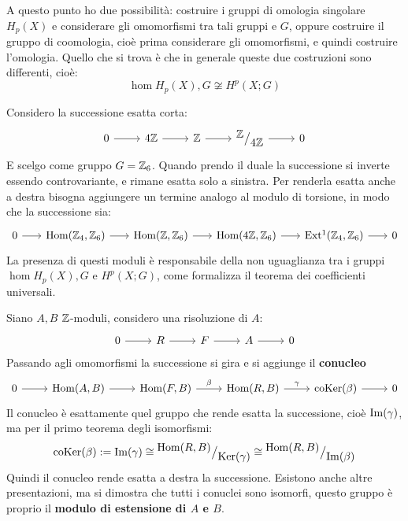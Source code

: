 A questo punto ho due possibilità: costruire i gruppi di omologia singolare
$ H_p(X) $ e considerare gli omomorfismi tra tali gruppi e $ G $, oppure
costruire il gruppo di coomologia, cioè prima considerare gli omomorfismi, e
quindi costruire l'omologia. Quello che si trova è che in generale queste
due costruzioni sono differenti, cioè:
\[
  \hom{H_p(X), G} \not \cong H^p(X ; G)
\]

\begin{example}
  Considero la successione esatta corta:
  \[
    \begin{tikzcd}
      0 \rar & 4 \Z \rar & \Z \rar & \quot{\Z}{4\Z} \rar & 0
    \end{tikzcd}
  \]
  E scelgo come gruppo $ G = \mathbb{Z}_6 $.
  Quando prendo il duale la successione si inverte essendo controvariante,
  e rimane esatta solo a sinistra. Per renderla esatta anche a destra bisogna
  aggiungere un termine analogo al modulo di torsione, in modo che la successione
  sia:
  \[
    \begin{tikzcd}[nodes = {column sep = 18 pt}]
      0 \rar & \hom{\Z_4, \Z_6} \rar & \hom{\Z, \Z_6} \rar & \hom{4\Z, \Z_6} \rar & \ext{\Z_4, \Z_6} \rar & 0
    \end{tikzcd}
  \]
  La presenza di questi moduli è responsabile della non uguaglianza tra i gruppi
  $ \hom{H_p(X), G} $ e $ H^p(X ; G) $, come formalizza il teorema dei
  coefficienti universali.
\end{example}
\begin{definition}
  Siano $ A, B $ $ \mathbb{Z} $-moduli, considero una risoluzione di $ A $:
  \[
    \begin{tikzcd}
      0 \rar & R \rar & F \rar & A \rar & 0
    \end{tikzcd}
  \]
  Passando agli omomorfismi la successione si gira e si aggiunge il \textbf{conucleo}
  \[
    \begin{tikzcd}
      0 \rar & \hom{A,B} \rar & \hom{F,B} \rar{\beta} & \hom{R,B} \rar{\gamma} & \coker{\beta} \rar & 0
    \end{tikzcd}
  \]
  Il conucleo è esattamente quel gruppo che rende esatta la successione, cioè
  $ \mathrm{Im}( \gamma ) $, ma per il primo teorema degli isomorfismi:
  \[
    \mathrm{coKer}( \beta) := \mathrm{Im}( \gamma ) \cong {^{\textstyle \mathrm{Hom}( R,B)}\big/_{\textstyle \mathrm{Ker}( \gamma)}} \cong {^{\textstyle \mathrm{Hom}( R,B)}\big/_{\textstyle \mathrm{Im}( \beta )}}
  \]
  Quindi il conucleo rende esatta a destra la successione.
  Esistono anche altre presentazioni, ma si dimostra che tutti i conuclei sono isomorfi,
  questo gruppo è proprio il \textbf{modulo di estensione di $ A $ e $ B $}.
\end{definition}
